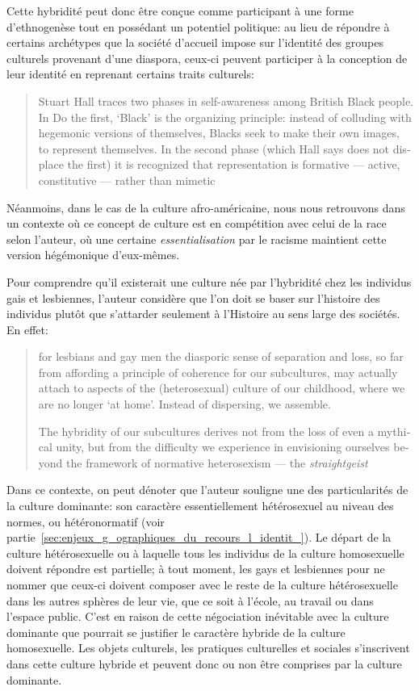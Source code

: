 Cette hybridité peut donc être conçue comme participant à une forme d'ethnogenèse tout en possédant un potentiel politique: au lieu de répondre à certains archétypes que la société d'accueil impose sur l'identité des groupes culturels provenant d'une diaspora, ceux-ci peuvent participer à la conception de leur identité en reprenant certains traits culturels:
\foreignblockquote{english}[{\cite[277]{Sinfield1996}}][.]{Stuart Hall traces
  two phases in self-awareness among British Black people. In Do the first,
  `Black' is the organizing principle: instead of colluding with hegemonic
  versions of themselves, Blacks seek to make their own images, to represent
  themselves. In the second phase (which Hall says does not displace the first)
  it is recognized that representation is formative --- active, constitutive ---
  rather than mimetic}.
Néanmoins, dans le cas de la culture afro-américaine, nous nous retrouvons dans un contexte où ce concept de culture est en compétition avec celui de la race selon l'auteur, où une certaine \emph{essentialisation} par le racisme maintient cette version hégémonique d'eux-mêmes.

Pour comprendre qu'il existerait une culture née par l'hybridité chez les individus gais et lesbiennes, l'auteur considère que l'on doit se baser sur l'histoire des individus plutôt que s'attarder seulement à l'Histoire au sens large des sociétés. 
En effet:
\foreignblockquote{english}[{\cite[280]{Sinfield1996}}][.]{\textelp{} for lesbians
  and gay men the diasporic sense of separation and loss, so far from affording
  a principle of coherence for our subcultures, may actually attach to aspects
  of the (heterosexual) culture of our childhood, where we are no longer `at
  home'. Instead of dispersing, we assemble.

  The hybridity of our subcultures derives not from the loss of even a mythical
  unity, but from the difficulty we experience in envisioning ourselves beyond
  the framework of normative heterosexism --- the \emph{straightgeist} \textelp{}}
Dans ce contexte, on peut dénoter que l'auteur souligne une des particularités de la culture dominante: son caractère essentiellement hétérosexuel au niveau des normes, ou hétéronormatif (voir partie~\ref{sec:enjeux_g_ographiques_du_recours_l_identit_}). 
Le départ de la culture hétérosexuelle ou  à laquelle tous les individus de la culture homosexuelle doivent répondre est partielle; à tout moment, les gays et lesbiennes pour ne nommer que ceux-ci doivent composer avec le reste de la culture hétérosexuelle dans les autres sphères de leur vie, que ce soit à l'école, au travail ou dans l'espace public. 
C'est en raison de cette négociation inévitable avec la culture dominante que pourrait se justifier le caractère hybride de la culture homosexuelle. 
Les objets culturels, les pratiques culturelles et sociales s'inscrivent dans cette culture hybride et peuvent donc ou non être comprises par la culture dominante.

